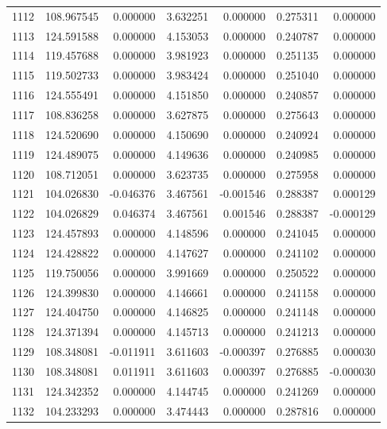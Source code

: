 \begin{tabular}{rrrrrrr}
1112 & 108.967545 &    0.000000 &  3.632251 &    0.000000 &    0.275311 &  0.000000 \\
1113 & 124.591588 &    0.000000 &  4.153053 &    0.000000 &    0.240787 &  0.000000 \\
1114 & 119.457688 &    0.000000 &  3.981923 &    0.000000 &    0.251135 &  0.000000 \\
1115 & 119.502733 &    0.000000 &  3.983424 &    0.000000 &    0.251040 &  0.000000 \\
1116 & 124.555491 &    0.000000 &  4.151850 &    0.000000 &    0.240857 &  0.000000 \\
1117 & 108.836258 &    0.000000 &  3.627875 &    0.000000 &    0.275643 &  0.000000 \\
1118 & 124.520690 &    0.000000 &  4.150690 &    0.000000 &    0.240924 &  0.000000 \\
1119 & 124.489075 &    0.000000 &  4.149636 &    0.000000 &    0.240985 &  0.000000 \\
1120 & 108.712051 &    0.000000 &  3.623735 &    0.000000 &    0.275958 &  0.000000 \\
1121 & 104.026830 &   -0.046376 &  3.467561 &   -0.001546 &    0.288387 &  0.000129 \\
1122 & 104.026829 &    0.046374 &  3.467561 &    0.001546 &    0.288387 & -0.000129 \\
1123 & 124.457893 &    0.000000 &  4.148596 &    0.000000 &    0.241045 &  0.000000 \\
1124 & 124.428822 &    0.000000 &  4.147627 &    0.000000 &    0.241102 &  0.000000 \\
1125 & 119.750056 &    0.000000 &  3.991669 &    0.000000 &    0.250522 &  0.000000 \\
1126 & 124.399830 &    0.000000 &  4.146661 &    0.000000 &    0.241158 &  0.000000 \\
1127 & 124.404750 &    0.000000 &  4.146825 &    0.000000 &    0.241148 &  0.000000 \\
1128 & 124.371394 &    0.000000 &  4.145713 &    0.000000 &    0.241213 &  0.000000 \\
1129 & 108.348081 &   -0.011911 &  3.611603 &   -0.000397 &    0.276885 &  0.000030 \\
1130 & 108.348081 &    0.011911 &  3.611603 &    0.000397 &    0.276885 & -0.000030 \\
1131 & 124.342352 &    0.000000 &  4.144745 &    0.000000 &    0.241269 &  0.000000 \\
1132 & 104.233293 &    0.000000 &  3.474443 &    0.000000 &    0.287816 &  0.000000 \\

\end{tabular}
